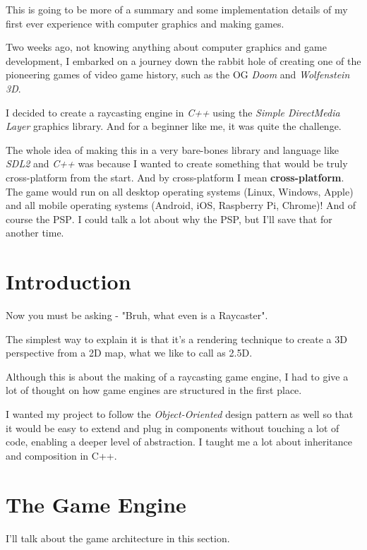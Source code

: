 \justify
\skipspace

This is going to be more of a summary and some implementation details of my first ever experience with computer graphics and making games.

Two weeks ago, not knowing anything about computer graphics and game development, I embarked on a journey down the rabbit hole of creating one of the pioneering games of video game history, such as the OG \textit{Doom} and \textit{Wolfenstein 3D}.

I decided to create a raycasting engine in \textit{C++} using the \textit{Simple DirectMedia Layer} graphics library. And for a beginner like me, it was quite the challenge.

The whole idea of making this in a very bare-bones library and language like \textit{SDL2} and \textit{C++} was because I wanted to create something that would be truly cross-platform from the start. And by cross-platform I mean \textbf{cross-platform}. The game would run on all desktop operating systems (Linux, Windows, Apple) and all mobile operating systems (Android, iOS, Raspberry Pi, Chrome)! And of course the \textsc{PSP}. I could talk a lot about why the PSP, but I'll save that for another time.

\section*{Introduction}

Now you must be asking - "Bruh, what even is a Raycaster".

The simplest way to explain it is that it's a rendering technique to create a 3D perspective from a 2D map, what we like to call as 2.5D.

Although this is about the making of a raycasting game engine, I had to give a lot of thought on how game engines are structured in the first place.

I wanted my project to follow the \textit{Object-Oriented} design pattern as well so that it would be easy to extend and plug in components without touching a lot of code, enabling a deeper level of abstraction. I taught me a lot about inheritance and composition in C++.

\section*{The Game Engine}

I'll talk about the game architecture in this section.


